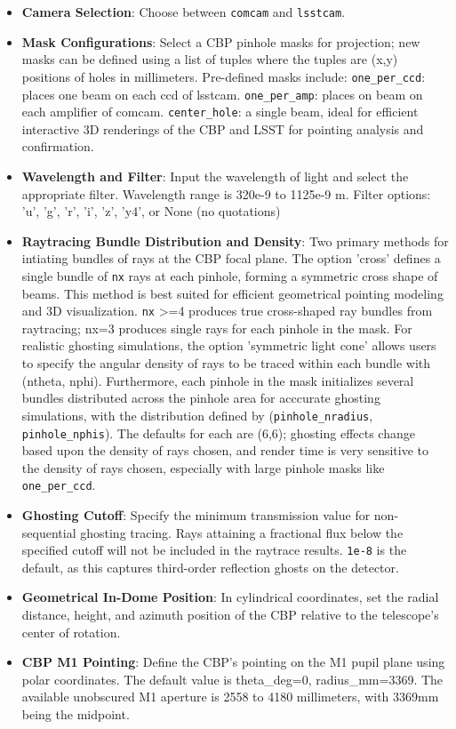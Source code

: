 \documentclass[SE,authoryear,toc]{lsstdoc}
\begin{document}
\begin{itemize}
    \item \textbf{Camera Selection}: Choose between \texttt{comcam} and \texttt{lsstcam}.
    \item \textbf{Mask Configurations}: Select a CBP pinhole masks for projection; new masks can be defined using a list of tuples where the tuples are (x,y) positions of holes in millimeters. Pre-defined masks include: \texttt{one\_per\_ccd}: places one beam on each ccd of lsstcam. \texttt{one\_per\_amp}: places on beam on each amplifier of comcam. \texttt{center\_hole}: a single beam, ideal for efficient interactive 3D renderings of the CBP and LSST for pointing analysis and confirmation.
    
    \item \textbf{Wavelength and Filter}: Input the wavelength of light and select the appropriate filter. Wavelength range is 320e-9 to 1125e-9 m. Filter options: 'u', 'g', 'r', 'i', 'z', 'y4', or None (no quotations)
    
    \item \textbf{Raytracing Bundle Distribution and  Density}: Two primary methods for intiating bundles of rays at the CBP focal plane. The option 'cross' defines a single bundle of \texttt{nx} rays at each pinhole, forming a symmetric cross shape of beams. This method is best suited for efficient geometrical pointing modeling and 3D visualization. \texttt{nx} >=4 produces true cross-shaped ray bundles from raytracing; nx=3 produces single rays for each pinhole in the mask. For realistic ghosting simulations, the option 'symmetric light cone' allows users to specify the angular density of rays to be traced within each bundle with (ntheta, nphi). Furthermore, each pinhole in the mask initializes several bundles distributed across the pinhole area for acccurate ghosting simulations, with the distribution defined by (\texttt{pinhole\_nradius}, \texttt{pinhole\_nphis}). The defaults for each are (6,6); ghosting effects change based upon the density of rays chosen, and render time is very sensitive to the density of rays chosen, especially with large pinhole masks like \texttt{one\_per\_ccd}. 

    \item \textbf{Ghosting Cutoff}: Specify the minimum transmission value for non-sequential ghosting tracing. Rays attaining a fractional flux below the specified cutoff will not be included in the raytrace results. \texttt{1e-8} is the default, as this captures third-order reflection ghosts on the detector.
    \item \textbf{Geometrical In-Dome Position}: In cylindrical coordinates, set the radial distance, height, and azimuth position of the CBP relative to the telescope’s center of rotation.
    \item \textbf{CBP M1 Pointing}: Define the CBP's pointing on the M1 pupil plane using polar coordinates. The default value is theta_deg=0, radius_mm=3369. The available unobscured M1 aperture is 2558 to 4180 millimeters, with 3369mm being the midpoint.
    
\end{itemize}
\end{document}
